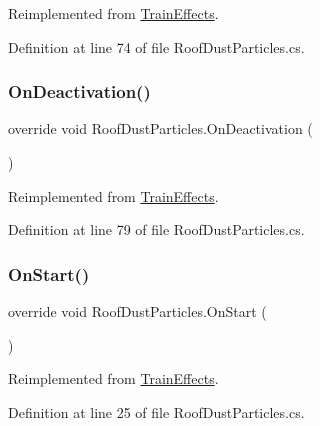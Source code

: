 Reimplemented from \mbox{\hyperlink{class_train_effects_ad77aba799a5d19a141128639a4bebcad}{Train\+Effects}}.



Definition at line 74 of file Roof\+Dust\+Particles.\+cs.

\mbox{\label{class_roof_dust_particles_a06d2c08d9bc936dfbb2c21f9201c84dc}} 
\subsubsection{\texorpdfstring{On\+Deactivation()}{OnDeactivation()}}
{\footnotesize\ttfamily override void Roof\+Dust\+Particles.\+On\+Deactivation (\begin{DoxyParamCaption}{ }\end{DoxyParamCaption})\hspace{0.3cm}{\ttfamily [virtual]}}



Reimplemented from \mbox{\hyperlink{class_train_effects_abc55d7e7440cb7a076c7342c3cf74165}{Train\+Effects}}.



Definition at line 79 of file Roof\+Dust\+Particles.\+cs.

\mbox{\label{class_roof_dust_particles_a9e7b2f81ef7025ae571f03c871b0d4fb}} 
\subsubsection{\texorpdfstring{On\+Start()}{OnStart()}}
{\footnotesize\ttfamily override void Roof\+Dust\+Particles.\+On\+Start (\begin{DoxyParamCaption}{ }\end{DoxyParamCaption})\hspace{0.3cm}{\ttfamily [virtual]}}



Reimplemented from \mbox{\hyperlink{class_train_effects_acabdc668bc9a6cf6d8d9e06fa5ccb071}{Train\+Effects}}.



Definition at line 25 of file Roof\+Dust\+Particles.\+cs.

